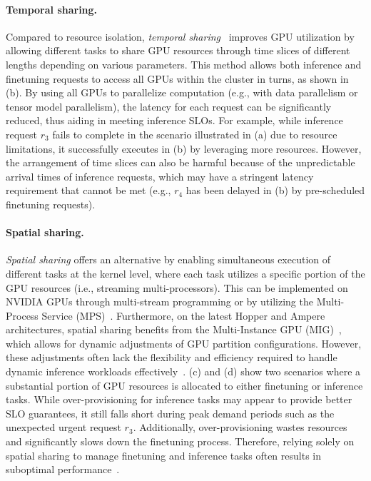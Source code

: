 \paragraph{Temporal sharing.}
Compared to resource isolation, \textit{temporal sharing}~\cite{xiao2018gandiva,xiao2020antman} improves GPU utilization by allowing different tasks to share GPU resources through time slices of different lengths depending on various parameters.
This method allows both inference and finetuning requests to access all GPUs within the cluster in turns, as shown in (b). By using all GPUs to parallelize computation (e.g., with data parallelism or tensor model parallelism), the latency for each request can be significantly reduced, thus aiding in meeting inference SLOs. For example, while inference request $r_3$ fails to complete in the scenario illustrated in (a) due to resource limitations, it successfully executes in (b) by leveraging more resources. However, the arrangement of time slices can also be harmful because of the unpredictable arrival times of inference requests, which may have a stringent latency requirement that cannot be met (e.g., $r_4$ has been delayed in (b) by pre-scheduled finetuning requests).

\paragraph{Spatial sharing.}
%
\textit{Spatial sharing} offers an alternative by enabling simultaneous execution of different tasks at the kernel level, where each task utilizes a specific portion of the GPU resources (i.e., streaming multi-processors).
%
This can be implemented on NVIDIA GPUs through multi-stream programming or by utilizing the Multi-Process Service (MPS)~\cite{mps}. Furthermore, on the latest Hopper and Ampere architectures, spatial sharing benefits from the Multi-Instance GPU (MIG)~\cite{mig}, which allows for dynamic adjustments of GPU partition configurations.
%
However, these adjustments often lack the flexibility and efficiency required to handle dynamic inference workloads effectively~\cite{dhakal2020gslice,yu2022survey,migpartition}. (c) and (d) show two scenarios where a substantial portion of GPU resources is allocated to either finetuning or inference tasks.
%
While over-provisioning for inference tasks may appear to provide better SLO guarantees, it still falls short during peak demand periods such as the unexpected urgent request $r_3$. Additionally, over-provisioning wastes resources and significantly slows down the finetuning process.
Therefore, relying solely on spatial sharing to manage finetuning and inference tasks often results in suboptimal performance~\cite{choi2022serving,zhao2023muxflow}.

